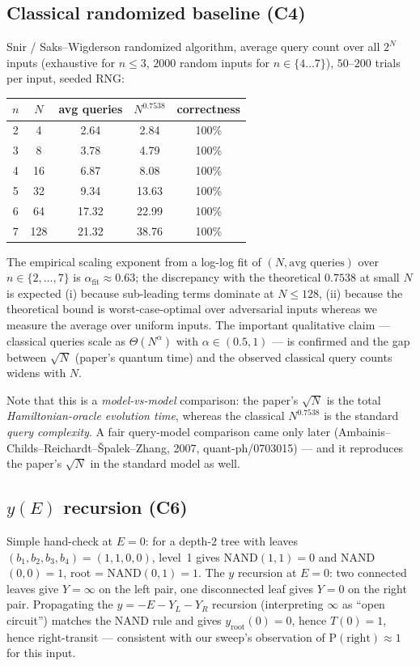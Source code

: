 \documentclass[11pt]{article}
\begin{document}
\subsection{Classical randomized baseline (C4)}
Snir / Saks--Wigderson randomized algorithm, average query count over all
$2^{N}$ inputs (exhaustive for $n\le 3$, $2000$ random inputs for
$n\in\{4\ldots 7\}$), $50$--$200$ trials per input, seeded RNG:
\begin{center}\small
\begin{tabular}{c c c c c}
\toprule
$n$ & $N$ & avg queries & $N^{0.7538}$ & correctness\\
\midrule
2 & 4   & 2.64  & 2.84  & 100\%\\
3 & 8   & 3.78  & 4.79  & 100\%\\
4 & 16  & 6.87  & 8.08  & 100\%\\
5 & 32  & 9.34  & 13.63 & 100\%\\
6 & 64  & 17.32 & 22.99 & 100\%\\
7 & 128 & 21.32 & 38.76 & 100\%\\
\bottomrule
\end{tabular}
\end{center}
The empirical scaling exponent from a log-log fit of
$(N, \text{avg queries})$ over $n\in\{2,\ldots,7\}$ is
$\alpha_{\text{fit}} \approx 0.63$; the discrepancy with the theoretical
$0.7538$ at small $N$ is expected (i) because sub-leading terms dominate at
$N\le 128$, (ii) because the theoretical bound is worst-case-optimal over
adversarial inputs whereas we measure the average over uniform inputs. The
important qualitative claim --- classical queries scale as
$\Theta(N^{\alpha})$ with $\alpha \in (0.5, 1)$ --- is confirmed and the
gap between $\sqrt N$ (paper's quantum time) and the observed classical
query counts widens with $N$.

Note that this is a \emph{model-vs-model} comparison: the paper's $\sqrt N$
is the total \emph{Hamiltonian-oracle evolution time}, whereas the classical
$N^{0.7538}$ is the standard \emph{query complexity}. A fair query-model
comparison came only later (Ambainis--Childs--Reichardt--\v{S}palek--Zhang,
2007, quant-ph/0703015) --- and it reproduces the paper's $\sqrt N$ in the
standard model as well.

\subsection{$y(E)$ recursion (C6)}
Simple hand-check at $E=0$: for a depth-$2$ tree with leaves
$(b_1,b_2,b_3,b_4) = (1,1,0,0)$, level~1 gives NAND$(1,1)=0$ and NAND$(0,0)=1$,
root = NAND$(0,1)=1$. The $y$ recursion at $E=0$: two connected leaves give
$Y=\infty$ on the left pair, one disconnected leaf gives $Y=0$ on the right
pair. Propagating the $y=-E-Y_L-Y_R$ recursion (interpreting $\infty$ as
``open circuit'') matches the NAND rule and gives $y_{\text{root}}(0)=0$,
hence $T(0)=1$, hence right-transit --- consistent with our sweep's
observation of $\mathrm P(\text{right})\approx 1$ for this input.
\end{document}
